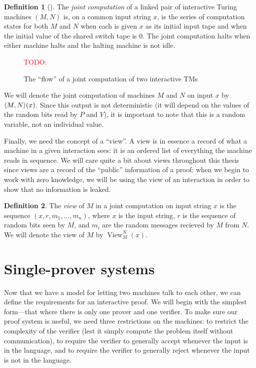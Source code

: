 \documentclass[english,12pt]{reedthesis}
\theoremstyle{plain}
\theoremstyle{definition}
\newtheorem{defn}[defn]{Definition}
\theoremstyle{remark}
\DeclareMathOperator{\View}{View}
\DeclarePairedDelimiter{\ang}{\langle}{\rangle}
\newcommand{\TODO}[1]{\textcolor{red}{TODO: #1}}
\begin{document}
\begin{defn}[{\cite[Def.\ 4.2.2]{Go01}}]\label{def:joint-comp}
  The \emph{joint computation} of a linked pair of interactive Turing machines
  $(M, N)$ is, on a common input string $x$, is the series of computation states
  for both $M$ and $N$ when each is given $x$ as its initial input tape and when
  the initial value of the shared switch tape is $0$. The joint computation
  halts when either machine halts and the halting machine is not idle.
\end{defn}

\begin{figure}
  \TODO{}
  \caption{The ``flow'' of a joint computation of two interactive TMs}\label{fig:joint-comp-flow}
\end{figure}

We will denote the joint computation of machines $M$ and $N$ on input $x$ by
$\ang{M, N}(x)$. Since this output is not deterministic (it will depend on the
values of the random bits read by $P$ and $V$), it is important to note that
this is a random variable, not an individual value.

Finally, we need the concept of a ``view''. A view is in essence a record of
what a machine in a given interaction sees: it is an ordered list of everything
the machine reads in sequence. We will care quite a bit about views throughout
this thesis since views are a record of the ``public'' information of a proof:
when we begin to work with zero knowledge, we will be using the view of an
interaction in order to show that no information is leaked.

\begin{defn}\label{def:view}
  The \emph{view} of $M$ in a joint computation on input string $x$ is the
  sequence $(x, r, m_{1}, \ldots, m_{n})$, where $x$ is the input string, $r$ is the
  sequence of random bits seen by $M$, and $m_{i}$ are the random messages
  recieved by $M$ from $N$. We will denote the view of $M$ by
  $\View_{M}^{N}(x)$.
\end{defn}

\section{Single-prover systems}\label{sec:single-prover}

Now that we have a model for letting two machines talk to each other, we can
define the requirements for an interactive proof. We will begin with the
simplest form---that where there is only one prover and one verifier. To make sure
our proof system is useful, we need three restrictions on the machines: to
restrict the complexity of the verifier (lest it simply compute the problem
itself without communication), to require the verifier to generally accept
whenever the input is in the language, and to require the verifier to generally
reject whenever the input is not in the language.
\end{document}
